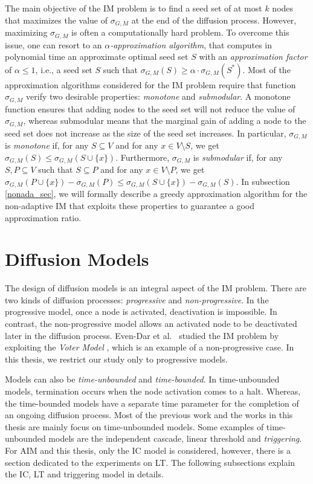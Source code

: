 The main objective of the IM problem is to find a seed set of at most $k$ nodes that maximizes the value of $\sigma_{G,M}$ at the end of the diffusion process. However, maximizing $\sigma_{G,M}$ is often a computationally hard problem. To overcome this issue, one can resort to an {\em $\alpha$-approximation algorithm}, that computes in polynomial time an approximate optimal seed set $S$ with an {\em approximation factor} of $\alpha\leq 1$, i.e., a seed set $S$ such that $\sigma_{G,M}(S)\geq \alpha\cdot \sigma_{G,M}(S^*)$. Most of the approximation algorithms considered for the IM problem require that function $\sigma_{G,M}$ verify two desirable properties: \emph{monotone} and \emph{submodular}. A monotone function ensures that adding nodes to the seed set will not reduce the value of $\sigma_{G,M}$, whereas submodular means that the marginal gain of adding a node to the seed set does not increase as the size of the seed set increases. In particular, $\sigma_{G,M}$ is {\em monotone} if, for any $S\subseteq V$ and for any $x\in V\setminus S$, we get $\sigma_{G,M}(S)\leq \sigma_{G,M}(S\cup\{x\})$. Furthermore, $\sigma_{G,M}$ is {\em submodular} if, for any $S,P\subseteq V$ such that $S\subseteq P$ and  for any $x\in V\setminus P$, we get $\sigma_{G,M}(P\cup\{x\})-\sigma_{G,M}(P)\leq \sigma_{G,M}(S\cup\{x\})-\sigma_{G,M}(S)$. In subsection \ref{nonada_sec}, we will formally describe a greedy approximation algorithm for the non-adaptive IM that exploits these properties to guarantee a good approximation ratio. 






\section{Diffusion Models}

The design of diffusion models is an integral aspect of the IM problem. There are two kinds of diffusion processes: \emph{progressive} and \emph{non-progressive}. In the progressive model, once a node is  activated, deactivation is impossible. In contrast, the non-progressive model allows an activated node to be deactivated later in the diffusion process. Even-Dar et al.~\cite{Even-Dar2007} studied the IM problem by exploiting the \emph{Voter Model} \cite{Clifford1973}, which is an example of a non-progressive case. In this thesis, we restrict our study only to progressive models. 

Models can also be \emph{time-unbounded} and \emph{time-bounded}. In time-unbounded models, termination occurs when the node activation comes to a halt. Whereas, the time-bounded models have a separate time parameter for the completion of an ongoing diffusion process. Most of the previous work and the works in this thesis are mainly focus on time-unbounded models. Some examples of time-unbounded models are the independent cascade, linear threshold and \emph{triggering}. For AIM and this thesis, only the IC model is considered, however, there is a section dedicated to the experiments on LT. The following subsections explain the IC, LT and triggering model in details.



